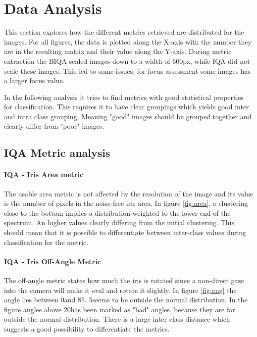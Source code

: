 \section{Data Analysis}
\label{sec:analysis}
This section explores how the different metrics retrieved are distributed for
the images.  For all figures, the data is plotted along the X-axis with the
number they are in the resulting matrix and their value along the Y-axis.
During metric extraction the BIQA scaled images down to a width of 600px, while
IQA did not scale these images.  This led to some issues, for focus assessment
some images has a larger focus value.

In the following analysis it tries to find metrics with good statistical
properties for classification. This requires it to have clear groupings which
yields good inter and intra class grouping. Meaning "good" images should be
grouped together and clearly differ from "poor" images.


\subsection{IQA Metric analysis}
\paragraph{IQA - Iris Area metric}
The usable area metric is not affected by the resolution of the image and its
value is the number of pixels in the noise-free iris area.
In figure \ref{fig:area}, a clustering close to the bottom implies a
distribution weighted to the lower end of the spectrum. An higher values clearly
differing from the initial clustering.  This should mean that it is possible to
differentiate between inter-class values during classification for the metric.


\paragraph{IQA - Iris Off-Angle Metric}
The off-angle metric states how much the iris is rotated since a non-direct gaze
into the camera will make it oval and rotate it slightly. In figure
\ref{fig:ang} the angle lies between 0\degree and 85\degree.
5\degree seems to be outside the normal distribution. In the figure 
angles above 20\degree has been marked as "bad" angles, because they are far
outside the normal distribution.  There is a large inter class distance which
suggests a good possibility to differentiate the metrics. 


